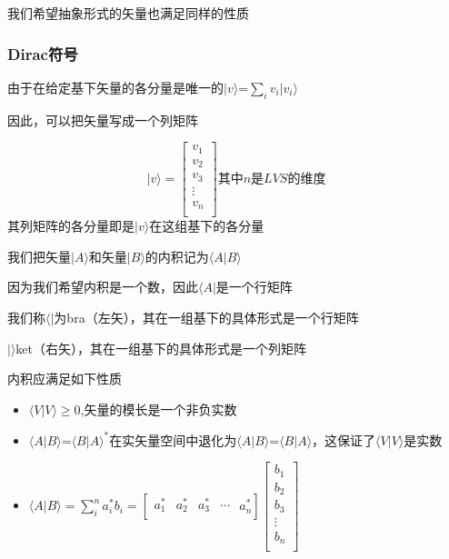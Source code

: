 \documentclass[lang=cn,15pt]{elegantbook}
\begin{document}
我们希望抽象形式的矢量也满足同样的性质

\subsubsection{Dirac符号}
由于在给定基下矢量的各分量是唯一的$|v\rangle$=$\sum_{i}v_i|v_i\rangle$

因此，可以把矢量写成一个列矩阵

\begin{equation}
	|v\rangle =\left[ \begin{array}{c}
		v_1\\
		v_2\\
		v_3\\
		\vdots\\
		v_n\\
	\end{array} \right] \text{其中}n\text{是}LVS\text{的维度}
\end{equation}
其列矩阵的各分量即是$|v\rangle$在这组基下的各分量

我们把矢量$|A\rangle$和矢量$|B\rangle$的内积记为$\langle A|B\rangle $

因为我们希望内积是一个数，因此$\langle A|$是一个行矩阵

我们称$\langle |$为bra（左矢），其在一组基下的具体形式是一个行矩阵

$|\rangle$ket（右矢），其在一组基下的具体形式是一个列矩阵

内积应满足如下性质
\begin{itemize}
	\item $\langle V|V\rangle \ge 0$,矢量的模长是一个非负实数
	\item $\langle A|B\rangle $=$\langle B|A\rangle^* $在实矢量空间中退化为$\langle A|B\rangle $=$\langle B|A\rangle $，这保证了$\langle V|V\rangle $是实数
	\item $\langle A|B\rangle =\sum_{i}^{n}a^{*}_i b_i=\left[ \begin{matrix}
		a_{1}^{*}&		a_{2}^{*}&		a_{3}^{*}&		\cdots\\
	\end{matrix}\,\,a_{n}^{*} \right] \left[ \begin{array}{c}
		b_1\\
		b_2\\
		b_3\\
		\vdots\\
		b_n\\
	\end{array} \right] $
\end{itemize}
\end{document}
